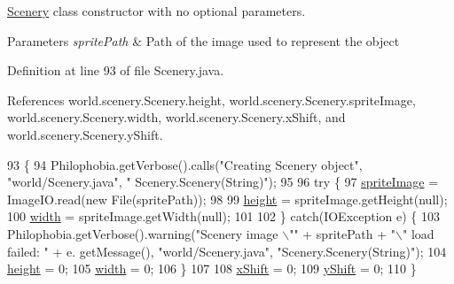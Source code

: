 \hyperlink{classworld_1_1scenery_1_1_scenery}{Scenery} class constructor with no optional parameters. 


\begin{DoxyParams}{Parameters}
{\em sprite\-Path} & Path of the image used to represent the object \\
\hline
\end{DoxyParams}


Definition at line 93 of file Scenery.\-java.



References world.\-scenery.\-Scenery.\-height, world.\-scenery.\-Scenery.\-sprite\-Image, world.\-scenery.\-Scenery.\-width, world.\-scenery.\-Scenery.\-x\-Shift, and world.\-scenery.\-Scenery.\-y\-Shift.


\begin{DoxyCode}
93                                             \{
94         Philophobia.getVerbose().calls(\textcolor{stringliteral}{"Creating Scenery object"}, \textcolor{stringliteral}{"world/Scenery.java"}, \textcolor{stringliteral}{"
      Scenery.Scenery(String)"});
95 
96         \textcolor{keywordflow}{try} \{
97             \hyperlink{classworld_1_1scenery_1_1_scenery_a512d9c0a154e6843389e343d80843326}{spriteImage} = ImageIO.read(\textcolor{keyword}{new} File(spritePath));
98 
99             \hyperlink{classworld_1_1scenery_1_1_scenery_a54b4edfa060087e78a829105bf62a900}{height} = spriteImage.getHeight(null);
100             \hyperlink{classworld_1_1scenery_1_1_scenery_ad10b27080954e2fc06aa1718f47c4ce1}{width} = spriteImage.getWidth(null);
101 
102         \} \textcolor{keywordflow}{catch}(IOException e) \{
103                 Philophobia.getVerbose().warning(\textcolor{stringliteral}{"Scenery image \(\backslash\)""} + spritePath + \textcolor{stringliteral}{"\(\backslash\)"  load failed: "} + e.
      getMessage(), \textcolor{stringliteral}{"world/Scenery.java"}, \textcolor{stringliteral}{"Scenery.Scenery(String)"});
104                 \hyperlink{classworld_1_1scenery_1_1_scenery_a54b4edfa060087e78a829105bf62a900}{height} = 0;
105                 \hyperlink{classworld_1_1scenery_1_1_scenery_ad10b27080954e2fc06aa1718f47c4ce1}{width} = 0;
106         \}
107 
108         \hyperlink{classworld_1_1scenery_1_1_scenery_a0999f105f7630fd67fd9d440da6983aa}{xShift} = 0;
109         \hyperlink{classworld_1_1scenery_1_1_scenery_ac9ca2c17cf6920deffe490c013b0e638}{yShift} = 0;
110     \}
\end{DoxyCode}
